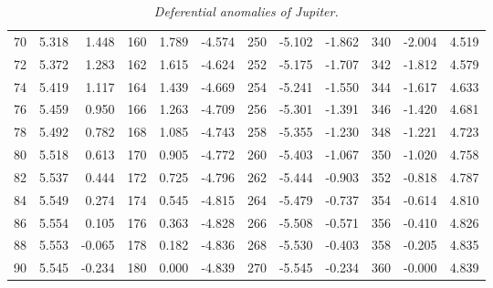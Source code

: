 \begin{table}
{\begin{tabular}{rrr|rrr|rrr|rrr}
 70 &   5.318 &  1.448 & 160 &   1.789 & -4.574 & 250 &  -5.102 & -1.862 & 340 &  -2.004 &  4.519\\
 72 &   5.372 &  1.283 & 162 &   1.615 & -4.624 & 252 &  -5.175 & -1.707 & 342 &  -1.812 &  4.579\\
 74 &   5.419 &  1.117 & 164 &   1.439 & -4.669 & 254 &  -5.241 & -1.550 & 344 &  -1.617 &  4.633\\
 76 &   5.459 &  0.950 & 166 &   1.263 & -4.709 & 256 &  -5.301 & -1.391 & 346 &  -1.420 &  4.681\\
 78 &   5.492 &  0.782 & 168 &   1.085 & -4.743 & 258 &  -5.355 & -1.230 & 348 &  -1.221 &  4.723\\
 80 &   5.518 &  0.613 & 170 &   0.905 & -4.772 & 260 &  -5.403 & -1.067 & 350 &  -1.020 &  4.758\\
 82 &   5.537 &  0.444 & 172 &   0.725 & -4.796 & 262 &  -5.444 & -0.903 & 352 &  -0.818 &  4.787\\
 84 &   5.549 &  0.274 & 174 &   0.545 & -4.815 & 264 &  -5.479 & -0.737 & 354 &  -0.614 &  4.810\\
 86 &   5.554 &  0.105 & 176 &   0.363 & -4.828 & 266 &  -5.508 & -0.571 & 356 &  -0.410 &  4.826\\
 88 &   5.553 & -0.065 & 178 &   0.182 & -4.836 & 268 &  -5.530 & -0.403 & 358 &  -0.205 &  4.835\\
 90 &   5.545 & -0.234 & 180 &   0.000 & -4.839 & 270 &  -5.545 & -0.234 & 360 &  -0.000 &  4.839\\
\end{tabular}}
\caption{\em Deferential anomalies of Jupiter.}\label{vt12}
\end{table}

